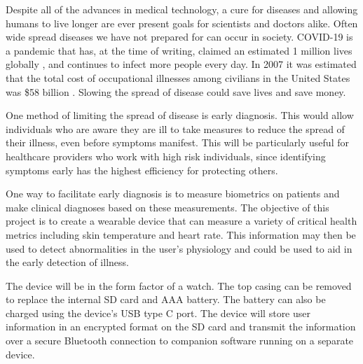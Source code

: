 \noindent
Despite all of the advances in medical technology, a cure for diseases and
allowing humans to live longer are ever present goals for scientists and 
doctors alike.  Often wide spread diseases we have not prepared for can occur in
society.  COVID-19 is a pandemic that
has, at the time of writing, claimed an estimated 1 million lives globally
\cite{johns-hopkins-corona-chan}, and continues to infect more people every
day.  In 2007 it was estimated that the total cost of occupational illnesses
among civilians in the United States was \$58 billion \cite{Leigh2011}.
Slowing the spread of disease could save lives and save money.


One method of limiting the spread of disease is early diagnosis.  This would
allow individuals who are aware they are ill to take measures to reduce the
spread of their illness, even before symptoms manifest.  This will be
particularly useful for healthcare providers who work with high risk
individuals, since identifying symptoms early has the highest efficiency for
protecting others.

One way to facilitate early diagnosis is to measure biometrics on patients and
make clinical diagnoses based on these measurements.
The objective of this project is to create a wearable device that can measure a
variety of critical health metrics including skin temperature and heart rate.
This information may then be used to detect abnormalities in the user’s 
physiology and could be used to aid in the early detection of illness.

The device will be in the form factor of a watch.  The top casing can be
removed to replace the internal SD card and AAA battery.  The battery can also
be charged using the device's USB type C port.  The device will store user
information in an encrypted format on the SD card and transmit the information
over a secure Bluetooth connection to companion software running on a separate
device.
